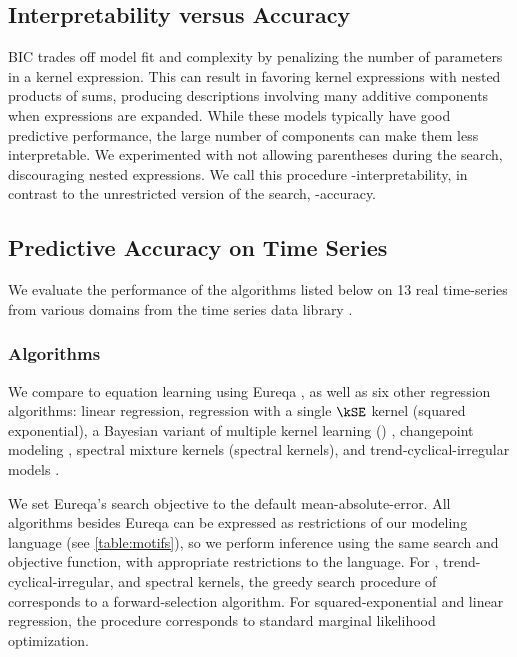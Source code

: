 \subsection{Interpretability versus Accuracy}

BIC trades off model fit and complexity by penalizing the number of parameters in a kernel expression.
This can result in \procedurename{} favoring kernel expressions with nested products of sums, producing descriptions involving many additive components when expressions are expanded.
While these models typically have good predictive performance, the large number of components can make them less interpretable.
We experimented with not allowing parentheses during the search, discouraging nested expressions.
We call this procedure \procedurename{}-interpretability, in contrast to the unrestricted version of the search, \procedurename{}-accuracy.


\subsection{Predictive Accuracy on Time Series}



We evaluate the performance of the algorithms listed below on 13 real time-series from various domains from the time series data library \citep{TSDL}.



\subsubsection{Algorithms}

We compare \procedurename{} to equation learning using Eureqa \citep{Eureqa}, as well as six other regression algorithms:
linear regression,
\gp{} regression with a single $\kSE$ kernel (squared exponential),
a Bayesian variant of multiple kernel learning (\MKL{}) \citep[e.g.][]{bach2004multiple},
changepoint modeling \citep[e.g.][]{garnett2010sequential, saatcci2010gaussian, FoxDunson:NIPS2012},
spectral mixture kernels \citep{WilAda13} (spectral kernels),
and trend-cyclical-irregular models \citep[e.g.][]{lind2006basic}.

We set Eureqa's search objective to the default mean-absolute-error.
All algorithms besides Eureqa can be expressed as restrictions of our modeling language (see \cref{table:motifs}), so we perform inference using the same search and objective function, with appropriate restrictions to the language.
For \MKL{}, trend-cyclical-irregular, and spectral kernels, the greedy search procedure of \procedurename{} corresponds to a forward-selection algorithm.
For squared-exponential and linear regression, the procedure corresponds to standard marginal likelihood optimization.

